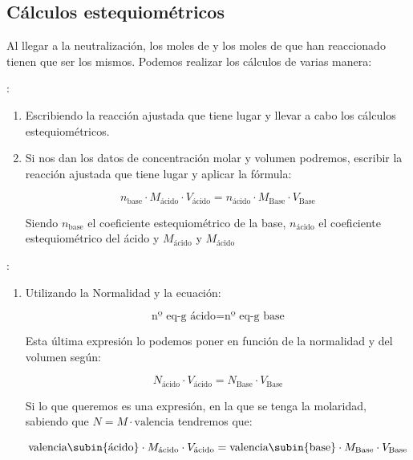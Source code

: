     \subsection{Cálculos estequiométricos}\label{subsec:calculos-estequiometricos}

    Al llegar a la neutralización, los moles de  y los moles de  que han reaccionado tienen que ser los mismos.
    Podemos realizar los cálculos de varias manera:

    :

    \begin{enumerate}[label=\numberballmDarkTeal]
        \item Escribiendo la reacción ajustada que tiene lugar y llevar a cabo los cálculos estequiométricos.
        \item Si nos dan los datos de concentración molar y volumen podremos, escribir la reacción ajustada que tiene lugar y aplicar la fórmula:

        \begin{equation}
            n_{\text{base}}\cdot M_{\text{ácido}}\cdot V_{\text{ácido}} = n_{\text{ácido}}\cdot M_{\text{Base}}\cdot V_{\text{Base}}\label{eq:valoracion-acido-base-ecuacion}
        \end{equation}

        Siendo \(n_{\text{base}}\) el coeficiente estequiométrico de la base, \(n_{\text{ácido}}\) el coeficiente estequiométrico del ácido y \(M_{\text{ácido}}\) y \(M_{\text{ácido}}\)
    \end{enumerate}

    :

    \begin{enumerate}[label=\numberballmDarkTeal]
        \item Utilizando la Normalidad y la ecuación:

        \begin{equation*}
            \text{nº eq-g ácido} =  \text{nº eq-g base}
        \end{equation*}

        Esta última expresión lo podemos poner en función de la normalidad y del volumen según:

        \begin{equation*}
            N_{\text{ácido}}\cdot V_{\text{ácido}} =  N_{\text{Base}}\cdot V_{\text{Base}}
        \end{equation*}

        Si lo que queremos es una expresión, en la que se tenga la molaridad, sabiendo que \(N = M \cdot \text{valencia}\) tendremos que:

        \begin{equation}
            \text{valencia\subin{ácido}}\cdot M_{\text{ácido}}\cdot V_{\text{ácido}} = \text{valencia\subin{base}}\cdot M_{\text{Base}}\cdot V_{\text{Base}}
        \end{equation}

    \end{enumerate}

